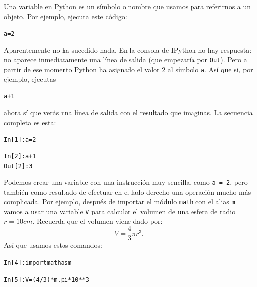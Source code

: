 \documentclass[10pt,a4paper]{article}\usepackage[]{graphicx}\usepackage[]{color}
\makeatletter
\newcommand{\hlnum}[1]{\textcolor[rgb]{0.686,0.059,0.569}{#1}}%
\newcommand{\hlopt}[1]{\textcolor[rgb]{0,0,0}{#1}}%
\newcommand{\hlstd}[1]{\textcolor[rgb]{0.345,0.345,0.345}{#1}}%
\newcommand{\hlkwb}[1]{\textcolor[rgb]{0.69,0.353,0.396}{#1}}%
\newenvironment{kframe}{%
 \def\at@end@of@kframe{}%
 \ifinner\ifhmode%
  \def\at@end@of@kframe{\end{minipage}}%
  \begin{minipage}{\columnwidth}%
 \fi\fi%
 \def\FrameCommand##1{\hskip\@totalleftmargin \hskip-\fboxsep
 \colorbox{shadecolor}{##1}\hskip-\fboxsep
     \hskip-\linewidth \hskip-\@totalleftmargin \hskip\columnwidth}%
 \MakeFramed {\advance\hsize-\width
   \@totalleftmargin\z@ \linewidth\hsize
   \@setminipage}}%
 {\par\unskip\endMakeFramed%
 \at@end@of@kframe}
\newenvironment{knitrout}{}{} %
\makeatother
\begin{document}
Una {\sf variable} en Python es un símbolo o nombre que usamos para referirnos a un objeto. Por ejemplo, ejecuta este código:
\begin{knitrout}
\color{fgcolor}\begin{kframe}
\begin{alltt}
\hlstd{a} \hlkwb{=} \hlnum{2}
\end{alltt}
\end{kframe}
\end{knitrout}
Aparentemente no ha sucedido nada. En la consola de IPython no hay respuesta: no aparece inmediatamente una línea de salida (que empezaría por {\tt Out}). Pero a partir de ese momento Python ha {\sf asignado} el valor 2 al símbolo {\tt a}. Así que si, por ejemplo, ejecutas
\begin{knitrout}
\color{fgcolor}\begin{kframe}
\begin{alltt}
\hlstd{a} \hlopt{+} \hlnum{1}
\end{alltt}
\end{kframe}
\end{knitrout}
ahora sí que verás una línea de salida con el resultado que imaginas. La secuencia completa es esta:
\begin{knitrout}
\color{fgcolor}\begin{kframe}
\begin{alltt}
\hlstd{In [}\hlnum{1}\hlstd{]}\hlopt{:} \hlstd{a} \hlkwb{=} \hlnum{2}

\hlstd{In [}\hlnum{2}\hlstd{]}\hlopt{:} \hlstd{a} \hlopt{+} \hlnum{1}
\hlstd{Out[}\hlnum{2}\hlstd{]}\hlopt{:} \hlnum{3}
\end{alltt}
\end{kframe}
\end{knitrout}
Podemos crear una variable con una instrucción muy sencilla, como {\tt a = 2}, pero también como resultado de efectuar en el lado derecho una operación mucho más complicada. Por ejemplo, después de importar el módulo {\tt math} con el alias {\tt m} vamos a usar una variable {\tt V} para calcular el volumen de una esfera de radio $r=10cm$. Recuerda que el volumen viene dado por:
\[V = \dfrac{4}{3}\pi r^3.\]
Así que usamos estos comandos:
\begin{knitrout}
\color{fgcolor}\begin{kframe}
\begin{alltt}
In [4]: import math as m

In [5]: V = (4 / 3) * m.pi * 10**3
\end{alltt}
\end{kframe}
\end{knitrout}
\end{document}
